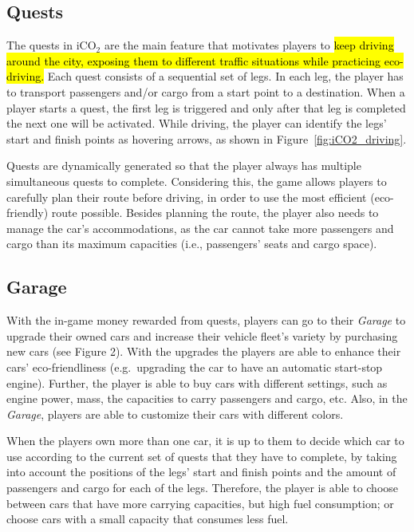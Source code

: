 \documentclass[preprint,authoryear,12pt]{elsarticle}
\newcommand{\hlc}[2][yellow]{ {\sethlcolor{#1} \hl{#2}} }
\begin{document}
\subsection{Quests}

The quests in iCO$_2$ are the main feature that motivates players to
\hlc[green]{ keep driving around the city, exposing them to different traffic situations 
	while practicing eco-driving.} Each quest consists of a sequential set of legs. In each leg, the player has to transport passengers and/or cargo from a start point to a destination. When a player starts a quest, the first leg is triggered and only after that leg is completed the next one will be activated. While driving, the player can identify the legs' start and finish points as hovering arrows, as shown in Figure~\ref{fig:iCO2_driving}.

Quests are dynamically generated so that the player always has multiple simultaneous quests to complete. Considering this, the game allows players to carefully plan their route before driving, in order to use the most efficient (eco-friendly) route possible. Besides planning the route, the player also needs to manage the car's accommodations, as the car cannot take more passengers and cargo than its maximum capacities (i.e., passengers' seats and cargo space).

\subsection{Garage}

With the in-game money rewarded from quests, players can go to their \textit{Garage} to upgrade their owned cars and increase their vehicle fleet's variety by purchasing new cars (see Figure 2). With the upgrades the players are able to enhance their cars' eco-friendliness (e.g.~upgrading the car to have an automatic start-stop engine). Further, the player is able to buy cars with different settings, such as engine power, mass, the capacities to carry passengers and cargo, etc. Also, in the \textit{Garage}, players are able to customize their cars with different colors.

When the players own more than one car, it is up to them to decide which car to use according to the current set of quests that they have to complete, by taking into account the positions of the legs' start and finish points and the amount of passengers and cargo for each of the legs. Therefore, the player is able to choose between cars that have more carrying capacities, but high fuel consumption; or choose cars with a small capacity that consumes less fuel.
\end{document}
